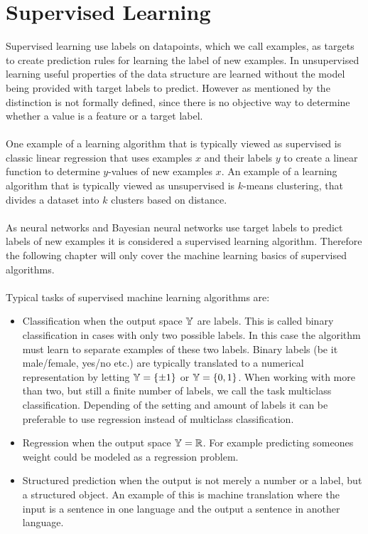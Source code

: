 \section{Supervised Learning}
Supervised learning use labels on datapoints, which we call examples, as targets to create prediction rules for learning the label of new examples. In unsupervised learning useful properties of the data structure are learned without the model being provided with target labels to predict. However as mentioned by \cite{Goodfellow-et-al-2016} the distinction is not formally defined, since there is no objective way to determine whether a value is a feature or a target label.\\
\\
One example of a learning algorithm that is typically viewed as supervised is classic linear regression that uses examples $x$ and their labels $y$ to create a linear function to determine $y$-values of new examples $x$. An example of a learning algorithm that is typically viewed as unsupervised is $k$-means clustering, that divides a dataset into $k$ clusters based on distance. \\
\\
As neural networks and Bayesian neural networks use target labels to predict labels of new examples it is considered a supervised learning algorithm. Therefore the following chapter will only cover the machine learning basics of supervised algorithms. \\
\\
Typical tasks of supervised machine learning algorithms are:
\begin{itemize}
    \item Classification when the output space $\mathbb{Y}$ are labels. This is called binary classification in cases with only two possible labels. In this case the algorithm must learn to separate examples of these two labels. Binary labels (be it male/female, yes/no etc.) are typically translated to a numerical representation by letting $\mathbb{Y} = \{ \pm 1 \}$ or $\mathbb{Y} = \{0,1 \}$. When working with more than two, but still a finite number of labels, we call the task multiclass classification. Depending of the setting and amount of labels it can be preferable to use regression instead of multiclass classification.
    \item Regression when the output space $\mathbb{Y} = \mathbb{R}$. For example predicting someones weight could be modeled as a regression problem.
    \item Structured prediction when the output is not merely a number or a label, but a structured object. An example of this is machine translation where the input is a sentence in one language and the output a sentence in another language. 
\end{itemize}


